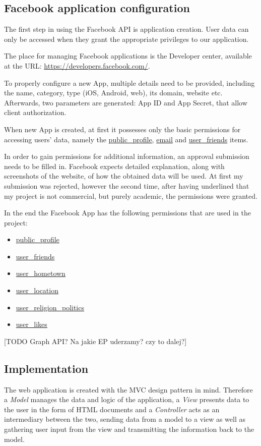 \documentclass[12pt]{report}
\begin{document}
\subsection{Facebook application configuration}
The first step in using the Facebook API is application creation. User data can only be accessed when they grant the appropriate privileges to our application.

The place for managing Facebook applications is the Developer center, available at the URL: \url{https://developers.facebook.com/}.

To properly configure a new App, multiple details need to be provided, including the name, category, type (iOS, Android, web), its domain, website etc. Afterwards, two parameters are generated: App ID and App Secret, that allow client authorization.

When new App is created, at first it possesses only the basic permissions for accessing users' data, namely the \url{public_profile}, \url{email} and \url{user_friends} items.

In order to gain permissions for additional information, an approval submission needs to be filled in. Facebook expects detailed explanation, along with screenshots of the website, of how the obtained data will be used. At first my submission was rejected, however the second time, after having underlined that my project is not commercial, but purely academic, the permissions were granted.

In the end the Facebook App has the following permissions that are used in the project:
\begin{itemize}
\item \url{public_profile}
\item \url{user_friends}
\item \url{user_hometown}
\item \url{user_location}
\item \url{user_religion_politics}
\item \url{user_likes}
\end{itemize}

[TODO Graph API? Na jakie EP uderzamy? czy to dalej?]

\subsection{Implementation}

The web application is created with the MVC design pattern in mind. Therefore a \textit{Model} manages the data and logic of the application, a \textit{View} presents data to the user in the form of HTML documents and a \textit{Controller} acts as an intermediary between the two, sending data from a model to a view as well as gathering user input from the view and transmitting the information back to the model.
\end{document}
